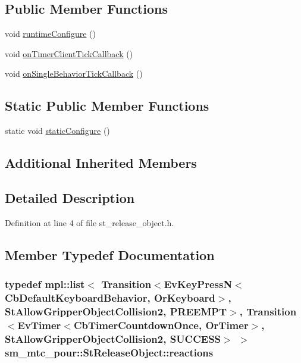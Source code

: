 \subsection*{Public Member Functions}
\begin{DoxyCompactItemize}
\item 
void \hyperlink{structsm__mtc__pour_1_1StReleaseObject_a4c1cc538085841f992f7006766ad4b81}{runtime\+Configure} ()
\item 
void \hyperlink{structsm__mtc__pour_1_1StReleaseObject_a663bad10ae68fbfcf1d52eebc78f3aaf}{on\+Timer\+Client\+Tick\+Callback} ()
\item 
void \hyperlink{structsm__mtc__pour_1_1StReleaseObject_ab94ca63a7edcaa64261c3c5acc4c7d2b}{on\+Single\+Behavior\+Tick\+Callback} ()
\end{DoxyCompactItemize}
\subsection*{Static Public Member Functions}
\begin{DoxyCompactItemize}
\item 
static void \hyperlink{structsm__mtc__pour_1_1StReleaseObject_a8abc05ee1378f03de4e2a4c0e26c180b}{static\+Configure} ()
\end{DoxyCompactItemize}
\subsection*{Additional Inherited Members}


\subsection{Detailed Description}


Definition at line 4 of file st\+\_\+release\+\_\+object.\+h.



\subsection{Member Typedef Documentation}
\subsubsection[{\texorpdfstring{reactions}{reactions}}]{\setlength{\rightskip}{0pt plus 5cm}typedef mpl\+::list$<$ Transition$<$Ev\+Key\+PressN$<$Cb\+Default\+Keyboard\+Behavior, {\bf Or\+Keyboard}$>$, {\bf St\+Allow\+Gripper\+Object\+Collision2}, {\bf P\+R\+E\+E\+M\+PT}$>$, Transition$<$Ev\+Timer$<$Cb\+Timer\+Countdown\+Once, {\bf Or\+Timer}$>$, {\bf St\+Allow\+Gripper\+Object\+Collision2}, {\bf S\+U\+C\+C\+E\+SS}$>$ $>$ {\bf sm\+\_\+mtc\+\_\+pour\+::\+St\+Release\+Object\+::reactions}}\hypertarget{structsm__mtc__pour_1_1StReleaseObject_ae38e5b2fc1d07ea40b33d36f784bb0ae}{}\label{structsm__mtc__pour_1_1StReleaseObject_ae38e5b2fc1d07ea40b33d36f784bb0ae}


